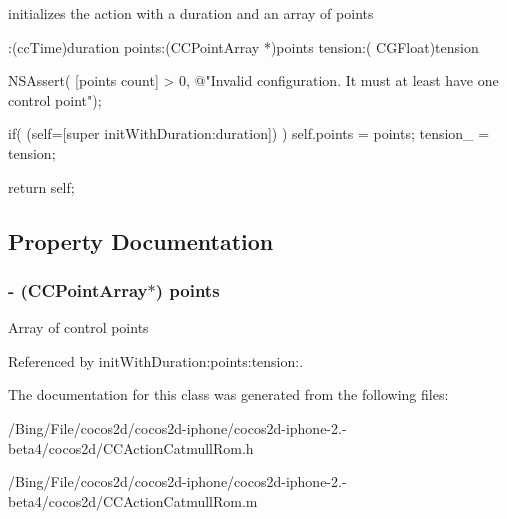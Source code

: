 initializes the action with a duration and an array of points 
\begin{DoxyCode}
                      :(ccTime)duration points:(CCPointArray *)points tension:(
      CGFloat)tension                                                          
{
        NSAssert( [points count] > 0, @"Invalid configuration. It must at least
       have one control point");

        if( (self=[super initWithDuration:duration]) )
        {
                self.points = points;
                tension_ = tension;
        }

        return self;
}
\end{DoxyCode}


\subsection{Property Documentation}
\hypertarget{interface_c_c_cardinal_spline_to_a580b5c52ae10ea8a920fcf1550bbf731}{
\subsubsection[{points}]{\setlength{\rightskip}{0pt plus 5cm}-\/ ({\bf C\-C\-Point\-Array}$\ast$) {\bf points}}}\label{interface_c_c_cardinal_spline_to_a580b5c52ae10ea8a920fcf1550bbf731}
Array of control points 

Referenced by init\-With\-Duration\-:points\-:tension\-:.



The documentation for this class was generated from the following files\-:\begin{DoxyCompactItemize}
\item 
/\-Bing/\-File/cocos2d/cocos2d-\/iphone/cocos2d-\/iphone-\/2.-\/beta4/cocos2d/C\-C\-Action\-Catmull\-Rom.\-h\item 
/\-Bing/\-File/cocos2d/cocos2d-\/iphone/cocos2d-\/iphone-\/2.-\/beta4/cocos2d/C\-C\-Action\-Catmull\-Rom.\-m\end{DoxyCompactItemize}
